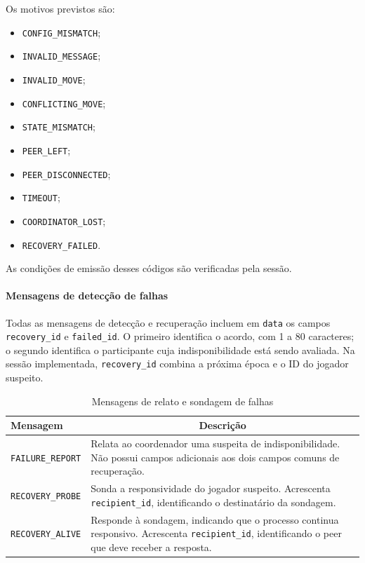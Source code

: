 \documentclass[11pt,a4paper]{article}
\begin{document}
Os motivos previstos são:

\begin{itemize}
    \item \texttt{CONFIG\_MISMATCH};
    \item \texttt{INVALID\_MESSAGE};
    \item \texttt{INVALID\_MOVE};
    \item \texttt{CONFLICTING\_MOVE};
    \item \texttt{STATE\_MISMATCH};
    \item \texttt{PEER\_LEFT};
    \item \texttt{PEER\_DISCONNECTED};
    \item \texttt{TIMEOUT};
    \item \texttt{COORDINATOR\_LOST};
    \item \texttt{RECOVERY\_FAILED}.
\end{itemize}

As condições de emissão desses códigos são verificadas pela sessão.

\paragraph{Mensagens de detecção de falhas}

Todas as mensagens de detecção e recuperação incluem em \texttt{data} os campos \texttt{recovery\_id} e \texttt{failed\_id}. O primeiro identifica o acordo, com 1 a 80 caracteres; o segundo identifica o participante cuja indisponibilidade está sendo avaliada. Na sessão implementada, \texttt{recovery\_id} combina a próxima época e o ID do jogador suspeito.

\begin{table}[H]
    \centering
    \caption{Mensagens de relato e sondagem de falhas}
    \label{tab:deteccao_p2p}
    \begin{tabular}{|p{4.3cm}|p{9.2cm}|}
        \hline
        \textbf{Mensagem} &
        \multicolumn{1}{c|}{\textbf{Descrição}} \\ \hline

        \texttt{FAILURE\_REPORT} &
        Relata ao coordenador uma suspeita de indisponibilidade. Não possui campos adicionais aos dois campos comuns de recuperação. \\ \hline

        \texttt{RECOVERY\_PROBE} &
        Sonda a responsividade do jogador suspeito. Acrescenta \texttt{recipient\_id}, identificando o destinatário da sondagem. \\ \hline

        \texttt{RECOVERY\_ALIVE} &
        Responde à sondagem, indicando que o processo continua responsivo. Acrescenta \texttt{recipient\_id}, identificando o peer que deve receber a resposta. \\ \hline
    \end{tabular}
\end{table}
\end{document}
